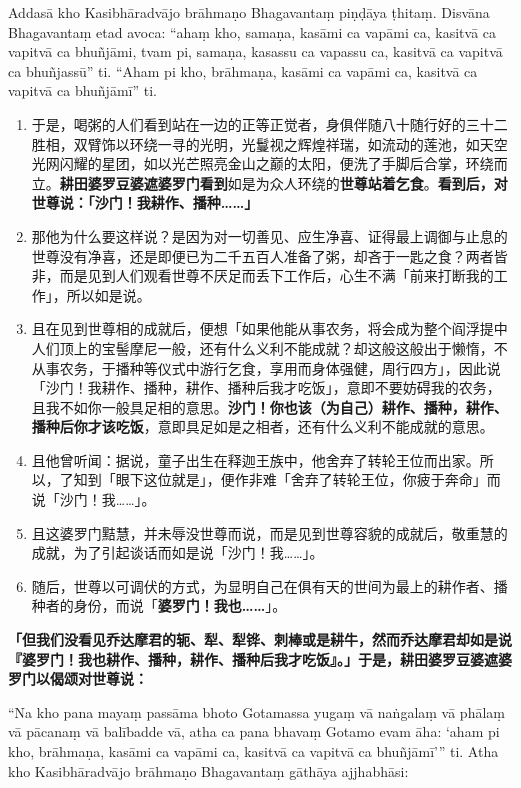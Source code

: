 Addasā kho Kasibhāradvājo brāhmaṇo Bhagavantaṃ piṇḍāya ṭhitaṃ. Disvāna Bhagavantaṃ etad avoca: “ahaṃ kho, samaṇa, kasāmi ca vapāmi ca, kasitvā ca vapitvā ca bhuñjāmi, tvam pi, samaṇa, kasassu ca vapassu ca, kasitvā ca vapitvā ca bhuñjassū” ti. “Aham pi kho, brāhmaṇa, kasāmi ca vapāmi ca, kasitvā ca vapitvā ca bhuñjāmī” ti.

\begin{enumerate}\item 于是，喝粥的人们看到站在一边的正等正觉者，身俱伴随八十随行好的三十二胜相，双臂饰以环绕一寻的光明，光鬘视之辉煌祥瑞，如流动的莲池，如天空光网闪耀的星团，如以光芒照亮金山之巅的太阳，便洗了手脚后合掌，环绕而立。\textbf{耕田婆罗豆婆遮婆罗门看到}如是为众人环绕的\textbf{世尊站着乞食}。\textbf{看到后，对世尊说：「沙门！我耕作、播种……」}
\item 那他为什么要这样说？是因为对一切善见、应生净喜、证得最上调御与止息的世尊没有净喜，还是即便已为二千五百人准备了粥，却吝于一匙之食？两者皆非，而是见到人们观看世尊不厌足而丢下工作后，心生不满「前来打断我的工作」，所以如是说。
\item 且在见到世尊相的成就后，便想「如果他能从事农务，将会成为整个阎浮提中人们顶上的宝髻摩尼一般，还有什么义利不能成就？却这般这般出于懒惰，不从事农务，于播种等仪式中游行乞食，享用而身体强健，周行四方」，因此说「沙门！我耕作、播种，耕作、播种后我才吃饭」，意即不要妨碍我的农务，且我不如你一般具足相的意思。\textbf{沙门！你也该（为自己）耕作、播种，耕作、播种后你才该吃饭}，意即具足如是之相者，还有什么义利不能成就的意思。
\item 且他曾听闻：据说，童子出生在释迦王族中，他舍弃了转轮王位而出家。所以，了知到「眼下这位就是」，便作非难「舍弃了转轮王位，你疲于奔命」而说「沙门！我……」。
\item 且这婆罗门黠慧，并未辱没世尊而说，而是见到世尊容貌的成就后，敬重慧的成就，为了引起谈话而如是说「沙门！我……」。
\item 随后，世尊以可调伏的方式，为显明自己在俱有天的世间为最上的耕作者、播种者的身份，而说「\textbf{婆罗门！我也……}」。\end{enumerate}

\textbf{「但我们没看见乔达摩君的轭、犁、犁铧、刺棒或是耕牛，然而乔达摩君却如是说『婆罗门！我也耕作、播种，耕作、播种后我才吃饭』。」于是，耕田婆罗豆婆遮婆罗门以偈颂对世尊说：}

“Na kho pana mayaṃ passāma bhoto Gotamassa yugaṃ vā naṅgalaṃ vā phālaṃ vā pācanaṃ vā balībadde vā, atha ca pana bhavaṃ Gotamo evam āha: ‘aham pi kho, brāhmaṇa, kasāmi ca vapāmi ca, kasitvā ca vapitvā ca bhuñjāmī’” ti. Atha kho Kasibhāradvājo brāhmaṇo Bhagavantaṃ gāthāya ajjhabhāsi:

